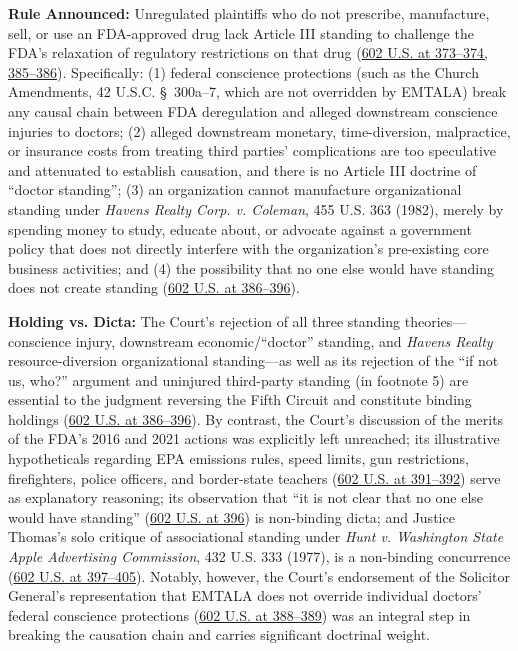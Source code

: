 \documentclass[12pt]{article}
\begin{document}
\textbf{Rule Announced:} Unregulated plaintiffs who do not prescribe, manufacture, sell, or use an FDA-approved drug lack Article III standing to challenge the FDA's relaxation of regulatory restrictions on that drug (\href{https://www.supremecourt.gov/opinions/23pdf/602us1r35_bqmd.pdf}{602 U.S. at 373--374, 385--386}). Specifically: (1) federal conscience protections (such as the Church Amendments, 42 U.S.C. \S~300a--7, which are not overridden by EMTALA) break any causal chain between FDA deregulation and alleged downstream conscience injuries to doctors; (2) alleged downstream monetary, time-diversion, malpractice, or insurance costs from treating third parties' complications are too speculative and attenuated to establish causation, and there is no Article III doctrine of ``doctor standing''; (3) an organization cannot manufacture organizational standing under \textit{Havens Realty Corp. v. Coleman}, 455 U.S. 363 (1982), merely by spending money to study, educate about, or advocate against a government policy that does not directly interfere with the organization's pre-existing core business activities; and (4) the possibility that no one else would have standing does not create standing (\href{https://www.supremecourt.gov/opinions/23pdf/602us1r35_bqmd.pdf}{602 U.S. at 386--396}).

\textbf{Holding vs. Dicta:} The Court's rejection of all three standing theories---conscience injury, downstream economic/``doctor'' standing, and \textit{Havens Realty} resource-diversion organizational standing---as well as its rejection of the ``if not us, who?'' argument and uninjured third-party standing (in footnote 5) are essential to the judgment reversing the Fifth Circuit and constitute binding holdings (\href{https://www.supremecourt.gov/opinions/23pdf/602us1r35_bqmd.pdf}{602 U.S. at 386--396}). By contrast, the Court's discussion of the merits of the FDA's 2016 and 2021 actions was explicitly left unreached; its illustrative hypotheticals regarding EPA emissions rules, speed limits, gun restrictions, firefighters, police officers, and border-state teachers (\href{https://www.supremecourt.gov/opinions/23pdf/602us1r35_bqmd.pdf}{602 U.S. at 391--392}) serve as explanatory reasoning; its observation that ``it is not clear that no one else would have standing'' (\href{https://www.supremecourt.gov/opinions/23pdf/602us1r35_bqmd.pdf}{602 U.S. at 396}) is non-binding dicta; and Justice Thomas's solo critique of associational standing under \textit{Hunt v. Washington State Apple Advertising Commission}, 432 U.S. 333 (1977), is a non-binding concurrence (\href{https://www.supremecourt.gov/opinions/23pdf/602us1r35_bqmd.pdf}{602 U.S. at 397--405}). Notably, however, the Court's endorsement of the Solicitor General's representation that EMTALA does not override individual doctors' federal conscience protections (\href{https://www.supremecourt.gov/opinions/23pdf/602us1r35_bqmd.pdf}{602 U.S. at 388--389}) was an integral step in breaking the causation chain and carries significant doctrinal weight.
\end{document}
